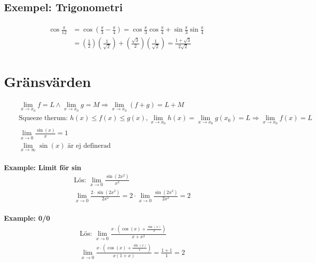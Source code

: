 \subsection{Exempel: Trigonometri}
\begin{align*}
  \begin{aligned} \cos \frac { \pi } { 12 } & = \cos \left( \frac { \pi } { 3 } - \frac { \pi } { 4 } \right) = \cos \frac { \pi } { 3 } \cos \frac { \pi } { 4 } + \sin \frac { \pi } { 3 } \sin \frac { \pi } { 4 } \\ & = \left( \frac { 1 } { 2 } \right) \left( \frac { 1 } { \sqrt { 2 } } \right) + \left( \frac { \sqrt { 3 } } { 2 } \right) \left( \frac { 1 } { \sqrt { 2 } } \right) = \frac { 1 + \sqrt { 3 } } { 2 \sqrt { 2 } } \end{aligned}
\end{align*}


\newpage


\section{Gränsvärden}
\begin{align*}
  &\quad  \lim_{x\to x_0} f = L \land \lim_{x\to x_0} g = M \Rightarrow \lim_{x\to x_0}(f+g) = L+M  \\
  &\quad  \text{Squeeze therum: } h(x) \leq f(x) \leq g(x), \lim_{x\to x_0} h(x) = \lim_{x\to x_0} g(x_0) = L
  \Rightarrow \lim_{x\to x_0} f(x) = L \\
  &\quad  \lim_{x\to 0} \frac{\sin(x)}{x}=1  \\
  &\quad  \lim_{x\to\infty} \sin(x) \text{ är ej definerad}  \\
\end{align*}


\textbf{Example: Limit för sin}
\begin{align*}
  &\quad  \text{Lös: } \lim_{x\to 0} \frac{\sin(2x^2)}{x^2}  \\
  &\quad  \lim_{x\to 0} \frac{2 \cdot \sin(2x^2)}{2x^2} = 2 \cdot \lim_{x\to 0} \frac{\sin(2x^2)}{2x^2} = 2 \\
\end{align*}

\textbf{Example: 0/0}
\begin{align*}
  &\quad  \text{Lös: } \lim_{x\to 0} \frac{x \cdot \left( \cos(x) + \frac{\sin(x)}{x} \right) }{x+x^2} \\
  &\quad  \lim_{x\to 0} \frac{ x \cdot \left( \cos(x) + \frac{ \sin(x) }{ x } \right) }{x(1+x)} = \frac{1+1}{1} = 2  \\
\end{align*}

